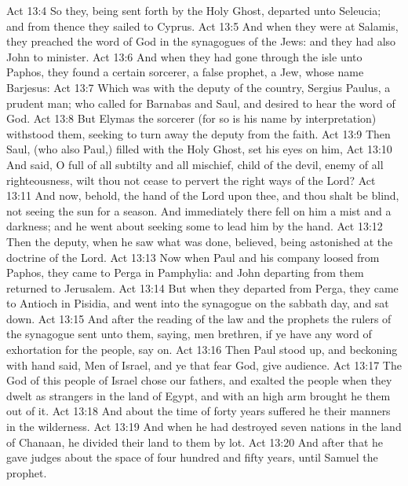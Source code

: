 \vs Act 13:4 So they, being sent forth by the Holy Ghost, departed unto Seleucia; and from thence they sailed to Cyprus.
\vs Act 13:5 And when they were at Salamis, they preached the word of God in the synagogues of the Jews: and they had also John to  minister.
\vs Act 13:6 And when they had gone through the isle unto Paphos, they found a certain sorcerer, a false prophet, a Jew, whose name  Barjesus:
\vs Act 13:7 Which was with the deputy of the country, Sergius Paulus, a prudent man; who called for Barnabas and Saul, and desired to hear the word of God.
\vs Act 13:8 But Elymas the sorcerer (for so is his name by interpretation) withstood them, seeking to turn away the deputy from the faith.
\vs Act 13:9 Then Saul, (who also  Paul,) filled with the Holy Ghost, set his eyes on him,
\vs Act 13:10 And said, O full of all subtilty and all mischief,  child of the devil,  enemy of all righteousness, wilt thou not cease to pervert the right ways of the Lord?
\vs Act 13:11 And now, behold, the hand of the Lord  upon thee, and thou shalt be blind, not seeing the sun for a season. And immediately there fell on him a mist and a darkness; and he went about seeking some to lead him by the hand.
\vs Act 13:12 Then the deputy, when he saw what was done, believed, being astonished at the doctrine of the Lord.
\vs Act 13:13 Now when Paul and his company loosed from Paphos, they came to Perga in Pamphylia: and John departing from them returned to Jerusalem.
\vs Act 13:14 But when they departed from Perga, they came to Antioch in Pisidia, and went into the synagogue on the sabbath day, and sat down.
\vs Act 13:15 And after the reading of the law and the prophets the rulers of the synagogue sent unto them, saying,  men  brethren, if ye have any word of exhortation for the people, say on.
\vs Act 13:16 Then Paul stood up, and beckoning with  hand said, Men of Israel, and ye that fear God, give audience.
\vs Act 13:17 The God of this people of Israel chose our fathers, and exalted the people when they dwelt as strangers in the land of Egypt, and with an high arm brought he them out of it.
\vs Act 13:18 And about the time of forty years suffered he their manners in the wilderness.
\vs Act 13:19 And when he had destroyed seven nations in the land of Chanaan, he divided their land to them by lot.
\vs Act 13:20 And after that he gave  judges about the space of four hundred and fifty years, until Samuel the prophet.
